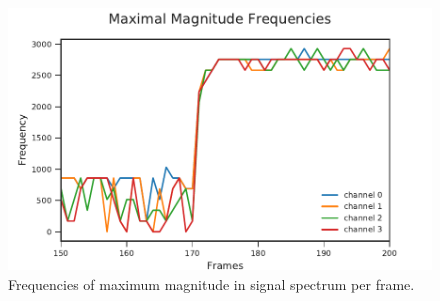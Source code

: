 \begin{figure}[ht]
	\centering
		\includegraphics[]{figures/maxFreq}
	\caption{Frequencies of maximum magnitude in signal spectrum per frame.}
    \label{fig:03_maxFreq}
\end{figure}
